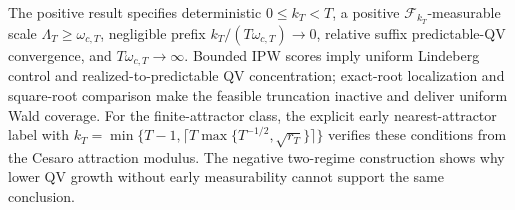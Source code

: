 The positive result specifies deterministic \(0\le k_T<T\), a positive \(\mathcal F_{k_T}\)-measurable scale \(\Lambda_T\ge\omega_{c,T}\), negligible prefix \(k_T/(T\omega_{c,T})\to0\), relative suffix predictable-QV convergence, and \(T\omega_{c,T}\to\infty\). Bounded IPW scores imply uniform Lindeberg control and realized-to-predictable QV concentration; exact-root localization and square-root comparison make the feasible truncation inactive and deliver uniform Wald coverage. For the finite-attractor class, the explicit early nearest-attractor label with \(k_T=\min\{T-1,\lceil T\max\{T^{-1/2},\sqrt{r_T}\}\rceil\}\) verifies these conditions from the Cesaro attraction modulus. The negative two-regime construction shows why lower QV growth without early measurability cannot support the same conclusion.